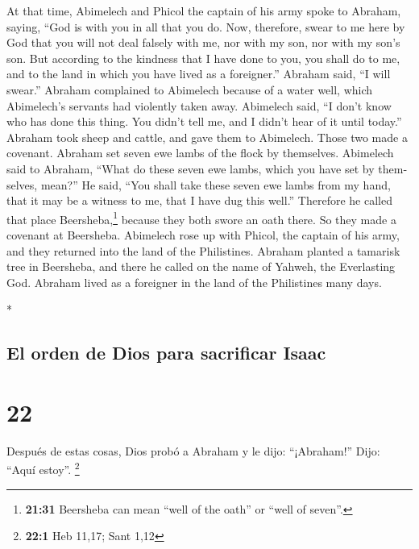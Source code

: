\begin{paracol}{2}
\begin{otherlanguage}{english}
 At that time, Abimelech and Phicol the captain of his
army spoke to Abraham, saying, ``God is with you in all that you do.
 Now, therefore, swear to me here by God that you will
not deal falsely with me, nor with my son, nor with my son's son. But
according to the kindness that I have done to you, you shall do to me,
and to the land in which you have lived as a foreigner.''
 Abraham said, ``I will swear.''  Abraham
complained to Abimelech because of a water well, which Abimelech's
servants had violently taken away.  Abimelech said, ``I
don't know who has done this thing. You didn't tell me, and I didn't
hear of it until today.''  Abraham took sheep and cattle,
and gave them to Abimelech. Those two made a covenant. 
Abraham set seven ewe lambs of the flock by themselves. 
Abimelech said to Abraham, ``What do these seven ewe lambs, which you
have set by themselves, mean?''  He said, ``You shall
take these seven ewe lambs from my hand, that it may be a witness to me,
that I have dug this well.''  Therefore he called that
place Beersheba,\footnote{\textbf{21:31} Beersheba can mean ``well of
  the oath'' or ``well of seven''.} because they both swore an oath
there.  So they made a covenant at Beersheba. Abimelech
rose up with Phicol, the captain of his army, and they returned into the
land of the Philistines.  Abraham planted a tamarisk tree
in Beersheba, and there he called on the name of Yahweh, the Everlasting
God.  Abraham lived as a foreigner in the land of the
Philistines many days.

\end{otherlanguage}

\switchcolumn[0]*

\hypertarget{el-orden-de-dios-para-sacrificar-isaac}{%
\subsection{El orden de Dios para sacrificar
Isaac}\label{el-orden-de-dios-para-sacrificar-isaac}}

\hypertarget{section-42}{%
\section{22}\label{section-42}}

 Después de estas cosas, Dios probó a Abraham y le dijo:
``¡Abraham!'' Dijo: ``Aquí estoy''. \footnote{\textbf{22:1} Heb 11,17;
  Sant 1,12}


\end{paracol}
